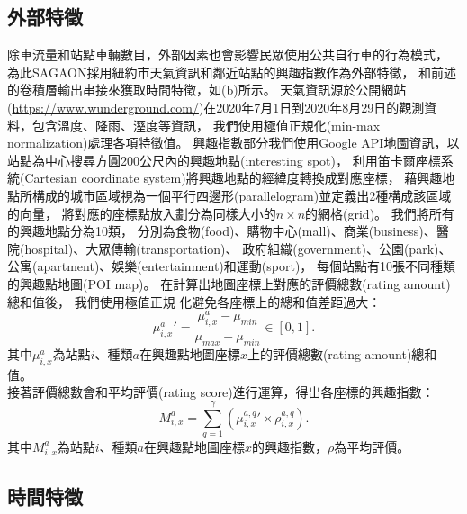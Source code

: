 \documentclass[a4paper,12pt]{extarticle}
\begin{document}
        \subsection{外部特徵}
            \label{subsec:point_of_interest}

            除車流量和站點車輛數目，外部因素也會影響民眾使用公共自行車的行為模式，
            為此SAGAON採用紐約市天氣資訊和鄰近站點的興趣指數作為外部特徵，
            和前述的卷積層輸出串接來獲取時間特徵，如(b)所示。
            天氣資訊源於公開網站(\url{https://www.wunderground.com/})在2020年7月1日到2020年8月29日的觀測資料，包含溫度、降雨、溼度等資訊，
            我們使用極值正規化(min-max normalization)處理各項特徵值。
            興趣指數部分我們使用Google API地圖資訊，以站點為中心搜尋方圓200公尺內的興趣地點(interesting spot)，
            利用笛卡爾座標系統(Cartesian coordinate system)將興趣地點的經緯度轉換成對應座標，
            藉興趣地點所構成的城市區域視為一個平行四邊形(parallelogram)並定義出2種構成該區域的向量，
            將對應的座標點放入劃分為同樣大小的$n \times n$的網格(grid)。
            我們將所有的興趣地點分為10類，
            分別為食物(food)、購物中心(mall)、商業(business)、醫院(hospital)、大眾傳輸(transportation)、
            政府組織(government)、公園(park)、公寓(apartment)、娛樂(entertainment)和運動(sport)，
            每個站點有10張不同種類的興趣點地圖(POI map)。
            在計算出地圖座標上對應的評價總數(rating amount)總和值後，
            我們使用極值正規    化避免各座標上的總和值差距過大：
            \begin{equation}
                {\mu_{i,x}^a}' = \frac{\mu_{i,x}^a - \mu_{min}}{\mu_{max} - \mu_{min}} \in [0,1].
            \end{equation}
            其中$\mu_{i,x}^a$為站點$i$、種類$a$在興趣點地圖座標$x$上的評價總數(rating amount)總和值。\\
            接著評價總數會和平均評價(rating score)進行運算，得出各座標的興趣指數：
            \begin{equation}
                M_{i,x}^a = \sum_{q=1}^{\gamma} ({\mu_{i,x}^{a,q}}' \times \rho_{i,x}^{a,q}).
            \end{equation}
            其中$M_{i,x}^a$為站點$i$、種類$a$在興趣點地圖座標$x$的興趣指數，$\rho$為平均評價。

        \subsection{時間特徵}
\end{document}
